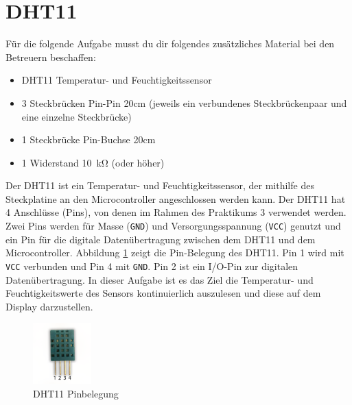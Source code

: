 \section{\ExercisePrefixEmbeddedC DHT11 \optional}

\optionaltextbox

Für die folgende Aufgabe musst du dir folgendes zusätzliches Material bei den Betreuern beschaffen:
\begin{itemize}
\item DHT11 Temperatur- und Feuchtigkeitssensor
\item 3 Steckbrücken Pin-Pin 20cm (jeweils ein verbundenes Steckbrückenpaar und eine einzelne Steckbrücke)
\item 1 Steckbrücke Pin-Buchse 20cm
\item 1 Widerstand \SI{10}{\kilo\ohm} (oder höher)
\end{itemize}

Der DHT11 ist ein Temperatur- und Feuchtigkeitssensor, der mithilfe des Steckplatine an den Microcontroller angeschlossen werden kann.
Der DHT11 hat 4 Anschlüsse (Pins), von denen im Rahmen des Praktikums 3 verwendet werden.
Zwei Pins werden für Masse (\lstinline|GND|) und Versorgungsspannung (\lstinline|VCC|) genutzt und ein Pin für die digitale Datenübertragung zwischen dem DHT11 und dem Microcontroller.
Abbildung \ref{fig:dht11Pins} zeigt die Pin-Belegung des DHT11.
Pin 1 wird mit \lstinline|VCC| verbunden und Pin 4 mit \lstinline|GND|.
Pin 2 ist ein I/O-Pin zur digitalen Datenübertragung.
In dieser Aufgabe ist es das Ziel die Temperatur- und Feuchtigkeitswerte des Sensors kontinuierlich auszulesen und diese auf dem Display darzustellen.
\begin{figure}[!htb]
	\centering
	\includegraphics[width=0.2\textwidth]{./05_c/figures/DHT11.png}
	\caption{DHT11 Pinbelegung}
	\label{fig:dht11Pins}
\end{figure} 

